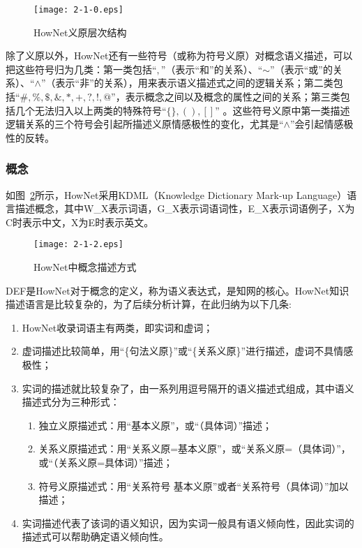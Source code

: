 \begin{figure}[htp]
\centering
\texttt{[image: 2-1-0.eps]}
\caption{HowNet义原层次结构}
\label{fig2-2}
\end{figure}

除了义原以外，HowNet还有一些符号（或称为符号义原）对概念语义描述，可以把这些符号归为几类：第一类包括“$ , $”（表示“和”的关系）、“$\sim $”（表示“或”的关系）、“$ \wedge$”（表示“非”的关系），用来表示语义描述式之间的逻辑关系；第二类包括“$\#, \%, \$, \& ,\ast,+,?,!,@ $”，表示概念之间以及概念的属性之间的关系；第三类包括几个无法归入以上两类的特殊符号“$\{\}, \left( \right), \left[ \right]$” 。这些符号义原中第一类描述逻辑关系的三个符号会引起所描述义原情感极性的变化，尤其是“$ \wedge$”会引起情感极性的反转。

\subsubsection{概念}
如图~\ref{fig2-3}所示，HowNet采用KDML（Knowledge Dictionary Mark-up Language）语言描述概念，其中W\_X表示词语，G\_X表示词语词性，E\_X表示词语例子，X为C时表示中文，X为E时表示英文。

\begin{figure}[htp]
\centering
\texttt{[image: 2-1-2.eps]}
\caption{HowNet中概念描述方式}
\label{fig2-3}
\end{figure}
DEF是HowNet对于概念的定义，称为语义表达式，是知网的核心。HowNet知识描述语言是比较复杂的，为了后续分析计算，在此归纳为以下几条:
\begin{enumerate}
\item HowNet收录词语主有两类，即实词和虚词；
\item 虚词描述比较简单，用“\{句法义原\}”或“\{关系义原\}”进行描述，虚词不具情感极性；
\item 实词的描述就比较复杂了，由一系列用逗号隔开的语义描述式组成，其中语义描述式分为三种形式：
     \begin{enumerate}
     \item 独立义原描述式：用“基本义原”，或“（具体词）”描述；
     \item 关系义原描述式：用“关系义原=基本义原”，或“关系义原=（具体词）”，或“（关系义原=具体词）”描述；
     \item 符号义原描述式：用“关系符号 基本义原”或者“关系符号（具体词）”加以描述；
     \end{enumerate}
\item 实词描述代表了该词的语义知识，因为实词一般具有语义倾向性，因此实词的描述式可以帮助确定语义倾向性。
\end{enumerate}

